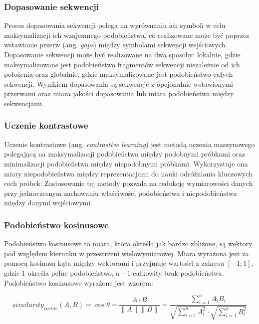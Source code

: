         \subsubsection{Dopasowanie sekwencji}

            Proces dopasowania sekwencji polega na wyrównaniu ich symboli w celu maksymalizacji ich wzajemnego podobieństwa, co realizowane może być poprzez wstawianie przerw (ang. \textit{gaps}) między symbolami sekwencji wejściowych. Dopasowanie sekwencji może być realizowane na dwa sposoby: lokalnie, gdzie maksymalizowane jest podobieństwo fragmentów sekwencji niezależnie od ich położenia oraz globalnie, gdzie maksymalizowane jest podobieństwo całych sekwencji. Wynikiem dopasowania są sekwencje z opcjonalnie wstawionymi przerwami oraz miara jakości dopasowania lub miara podobieństwa między sekwencjami.

        \subsubsection{Uczenie kontrastowe}
            
            Uczenie kontrastowe (ang. \textit{contrastive learning})\cite{Bromley1993} jest metodą uczenia maszynowego polegającą na maksymalizacji podobieństwa między podobnymi próbkami oraz minimalizacji podobieństwa między niepodobnymi próbkami. Wykorzystuje ona miary niepodobieństwa między reprezentacjami do nauki odróżniania kluczowych cech próbek. Zastosowanie tej metody pozwala na redukcję wymiarowości danych przy jednoczesnym zachowaniu właściwości podobieństwa i niepodobieństwa między danymi wejściowymi.

        \subsubsection{Podobieństwo kosinusowe}

            Podobieństwo kosinusowe to miara, która określa jak bardzo zbliżone, są wektory pod względem kierunku w przestrzeni wielowymiarowej. Miara wyrażona jest za pomocą kosinusa kąta między wektorami i przyjmuje wartości z zakresu $[-1; 1]$, gdzie $1$ określa pełne podobieństwo, a $-1$ całkowity brak podobieństwa. Podobieństwo kosinusowe wyrażone jest wzorem:

            \begin{equation}
                similarity_{cosine}(A, B) = \cos{\theta} = \frac{A \cdot B}{\|A\| \|B\|} = \frac{
                    \sum^{n}_{i = 1}A_i B_i
                }{
                    \sqrt{
                        \sum^{n}_{i = 1}A_i^2
                    }
                    \cdot
                    \sqrt{
                        \sum^{n}_{i = 1}B_i^2
                    }
                }
            \end{equation}


